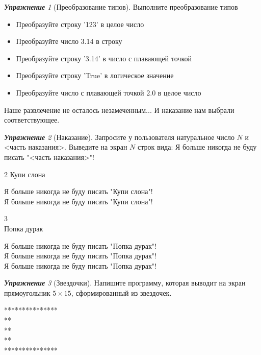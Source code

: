 \documentclass[a4,12pt]{article}
\theoremstyle{remark}
\newtheorem{exercise}{\textbf{Упражнение}}[section]
\begin{document}
\begin{exercise}[Преобразование типов]
Выполните преобразование типов
\begin{itemize}
    \item Преобразуйте строку '123' в целое число
    \item Преобразуйте число 3.14 в строку
    \item Преобразуйте строку '3.14' в число с плавающей точкой
    \item Преобразуйте строку 'True' в логическое значение
    \item Преобразуйте число с плавающей точкой 2.0 в целое число
\end{itemize}
\end{exercise}

\pagebreak
\epigraph{Наше развлечение не осталось незамеченным...
И наказание нам выбрали соответствующее.}{}
\begin{exercise}[Наказание]
Запросите у пользователя натуральное число $N$ и <часть наказания>. 
Выведите на экран $N$ строк вида: Я больше никогда не буду писать "<часть наказания>"!

\begin{inputformat}
2
Купи слона
\end{inputformat}

\begin{outputformat}
Я больше никогда не буду писать "Купи слона"! \\
Я больше никогда не буду писать "Купи слона"!
\end{outputformat}

\begin{inputformat}
3 \\
Попка дурак
\end{inputformat}

\begin{outputformat}
Я больше никогда не буду писать "Попка дурак"! \\
Я больше никогда не буду писать "Попка дурак"! \\
Я больше никогда не буду писать "Попка дурак"!
\end{outputformat}
\end{exercise}

\begin{exercise}[Звездочки]
Напишите программу, которая выводит на экран прямоугольник $5 \times 15$, сформированный из звездочек.

\begin{outputformat}
***************\\
*\hspace{6.5em}* \\
*\hspace{6.5em}* \\
*\hspace{6.5em}* \\
***************
\end{outputformat}
\end{exercise}
\end{document}
